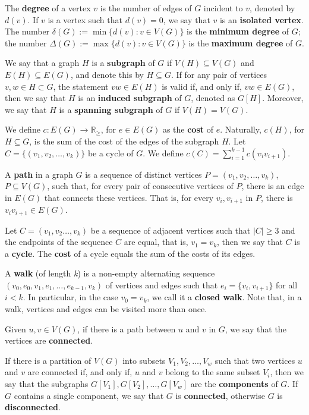 The \textbf{degree} of a vertex \(v\) is the number of edges of \(G\) incident to \(v\), denoted by \(d(v)\). If \(v\) is a vertex such that \(d(v) = 0\), we say that \(v\) is an \textbf{isolated vertex}. The number \(\delta(G) := \min \{d(v) \colon v \in V(G)\}\) is the \textbf{minimum degree} of \(G\); the number \(\Delta(G) := \max \{d(v) \colon v \in V(G)\}\) is the \textbf{maximum degree} of \(G\).

We say that a graph \(H\) is a \textbf{subgraph} of \(G\) if \(V(H) \subseteq V(G)\) and \(E(H) \subseteq E(G)\), and denote this by \(H \subseteq G\). If for any pair of vertices \(v, w \in H \subset G\), the statement \(vw \in E(H)\) is valid if, and only if, \(vw \in E(G)\), then we say that \(H\) is an \textbf{induced subgraph} of \(G\), denoted as \(G[H]\). Moreover, we say that \(H\) is a \textbf{spanning subgraph} of \(G\) if \(V(H) = V(G)\).

We define \(c \colon E(G) \to \mathbb{R}_\ge\), for \(e \in E(G)\) as the \textbf{cost} of \(e\). Naturally, \(c(H)\), for \(H \subseteq G\), is the sum of the cost of the edges of the subgraph \(H\). Let \(C = \{(v_1, v_2, \dots, v_k)\}\) be a cycle of \(G\). We define \(c(C) = \sum_{i=1}^{k-1} c(v_i v_{i+1})\).

A \textbf{path} in a graph \(G\) is a sequence of distinct vertices \(P = (v_1, v_2, \dots, v_k)\), \(P \subseteq V(G)\), such that, for every pair of consecutive vertices of \(P\), there is an edge in \(E(G)\) that connects these vertices. That is, for every \(v_i , v_{i+1}\) in \(P\), there is \(v_i v _{i+1} \in E(G)\).

Let \(C = (v_1, v_2 \dots, v_k)\) be a sequence of adjacent vertices such that \(|C| \geq 3\) and the endpoints of the sequence \(C\) are equal, that is, \(v_1 = v_k\), then we say that \(C\) is a \textbf{cycle}. The \textbf{cost} of a cycle equals the sum of the costs of its edges. 

A \textbf{walk} (of length \textit{k}) is a non-empty alternating sequence \((v_0, e_0, v_1, e_1, \dots, e_{k-1}, v_k)\) of vertices and edges such that \(e_i = \{v_i, v_{i+1}\}\) for all \(i < k\). In particular, in the case \(v_0 = v_k\), we call it a \textbf{closed walk}. Note that, in a walk, vertices and edges can be visited more than once.

Given \(u, v \in V(G)\), if there is a path between \(u\) and \(v\) in \(G\), we say that the vertices are \textbf{connected}.

If there is a partition of \(V(G)\) into subsets \(V_1 , V_2 , \dots, V_w\) such that two vertices \(u\) and \(v\) are connected if, and only if, \(u\) and \(v\) belong to the same subset \(V_i\), then we say that the subgraphs \(G[V_1], G[V_2], \dots, G[V_w]\) are the \textbf{components} of \(G\). If \(G\) contains a single component, we say that \(G\) is \textbf{connected}, otherwise \(G\) is \textbf{disconnected}.

